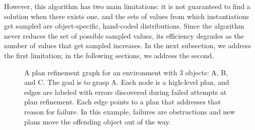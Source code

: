 However, this algorithm has two
main limitations: it is not guaranteed to find a solution when
there exists one, and the sets of values from which instantiations
get sampled are object-specific, hand-coded distributions. Since the algorithm
never reduces the set of possible sampled values, its
efficiency degrades as the number of values that get sampled increases. In the next subsection,
we address the first limitation; in the following sections, we address the second.

\begin{figure}[t]
  \centering
  \caption{\small{A plan refinement graph for an environment with 3
      objects: A, B, and C. The goal is to grasp A. Each node is a
      high-level plan, and edges are labeled with errors discovered during
      failed attempts at plan refinement. Each edge points to a plan
      that addresses that reason for failure. In this example, failures
      are obstructions and new plans move the offending object out of
      the way.}}
  \label{fig:prg}
\end{figure}

